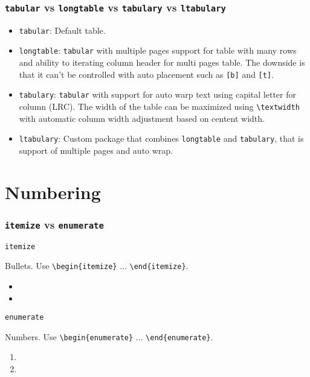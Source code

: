\documentclass{beamer}
\begin{document}
\begin{frame}[fragile]
  \frametitle{\texttt{tabular} vs \texttt{longtable} vs \texttt{tabulary} vs \texttt{ltabulary}}

  \begin{itemize}
    \item  \texttt{tabular}: Default table.
    \item \texttt{longtable}: \texttt{tabular} with multiple pages support for table with many rows and ability to iterating column header for multi pages table. The downside is that it can't be controlled with auto placement such as \texttt{[b]} and \texttt{[t]}.
    \item \texttt{tabulary}: \texttt{tabular} with support for auto warp text using capital letter for column (LRC). The width of the table can be maximized using \verb|\textwidth| with automatic column width adjustment based on centent width. 
    \item \texttt{ltabulary}: Custom package that combines \texttt{longtable} and \texttt{tabulary}, that is support of multiple pages and auto wrap.
  \end{itemize}


\end{frame}

\section{Numbering}
\begin{frame}[fragile]
  \frametitle{\texttt{itemize} vs \texttt{enumerate}}

  \texttt{itemize}

  Bullets. Use \verb|\begin{itemize}| ... \verb|\end{itemize}|.

  \begin{itemize}
    \item
    \item 
  \end{itemize}

  \vspace{\baselineskip}

  \texttt{enumerate}

  Numbers. Use \verb|\begin{enumerate}| ... \verb|\end{enumerate}|.

  \begin{enumerate}
    \item
    \item 
  \end{enumerate}

\end{frame}

\end{document}
